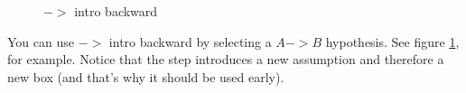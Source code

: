 \documentclass[11pt]{book}
\newcommand{\figref}[1]{figure \ref{fig:#1}}
\begin{document}
\begin{figure}
\centering
{}
\qquad
{}
\caption{$->$ intro backward}
\label{fig:arrowintrobackward}
\end{figure}

You can use $->$ intro backward by selecting a $A->B$ hypothesis. See \figref{arrowintrobackward}, for example. Notice that the step introduces a new assumption and therefore a new box (and that's why it should be used early).
\end{document}
